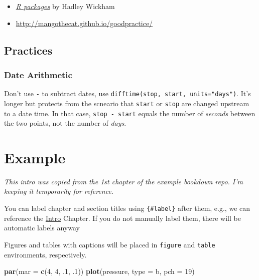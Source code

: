 \documentclass[
]{book}
\newenvironment{Shaded}{\begin{snugshade}}{\end{snugshade}}
\newcommand{\DataTypeTok}[1]{\textcolor[rgb]{0.13,0.29,0.53}{#1}}
\newcommand{\DecValTok}[1]{\textcolor[rgb]{0.00,0.00,0.81}{#1}}
\newcommand{\FloatTok}[1]{\textcolor[rgb]{0.00,0.00,0.81}{#1}}
\newcommand{\KeywordTok}[1]{\textcolor[rgb]{0.13,0.29,0.53}{\textbf{#1}}}
\newcommand{\NormalTok}[1]{#1}
\newcommand{\StringTok}[1]{\textcolor[rgb]{0.31,0.60,0.02}{#1}}
\begin{document}
\begin{itemize}
\item
  \href{http://r-pkgs.had.co.nz/}{\emph{R packages}} by Hadley Wickham
\item
  \url{http://mangothecat.github.io/goodpractice/}
\end{itemize}

\hypertarget{practices}{%
\section{Practices}\label{practices}}

\hypertarget{date-arithmetic}{%
\subsection{Date Arithmetic}\label{date-arithmetic}}

Don't use \texttt{-} to subtract dates, use \texttt{difftime(stop,\ start,\ units="days")}. It's longer but protects from the scneario that \texttt{start} or \texttt{stop} are changed upstream to a date time. In that case, \texttt{stop\ -\ start} equals the number of \emph{seconds} between the two points, not the number of \emph{days}.

\hypertarget{example-bookdown}{%
\chapter{Example}\label{example-bookdown}}

\emph{This intro was copied from the 1st chapter of the example bookdown repo. I'm keeping it temporarily for reference.}

You can label chapter and section titles using \texttt{\{\#label\}} after them, e.g., we can reference the \protect\hyperlink{intro}{Intro} Chapter. If you do not manually label them, there will be automatic labels anyway

Figures and tables with captions will be placed in \texttt{figure} and \texttt{table} environments, respectively.

\begin{Shaded}
\begin{Highlighting}[]
\KeywordTok{par}\NormalTok{(}\DataTypeTok{mar =} \KeywordTok{c}\NormalTok{(}\DecValTok{4}\NormalTok{, }\DecValTok{4}\NormalTok{, }\FloatTok{.1}\NormalTok{, }\FloatTok{.1}\NormalTok{))}
\KeywordTok{plot}\NormalTok{(pressure, }\DataTypeTok{type =} \StringTok{\textquotesingle{}b\textquotesingle{}}\NormalTok{, }\DataTypeTok{pch =} \DecValTok{19}\NormalTok{)}
\end{Highlighting}
\end{Shaded}
\end{document}
